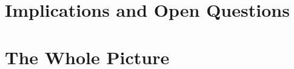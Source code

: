\documentclass{article}
\begin{document}
\part{Implications and Open Questions}





\part{The Whole Picture}








\appendix










\end{document}
